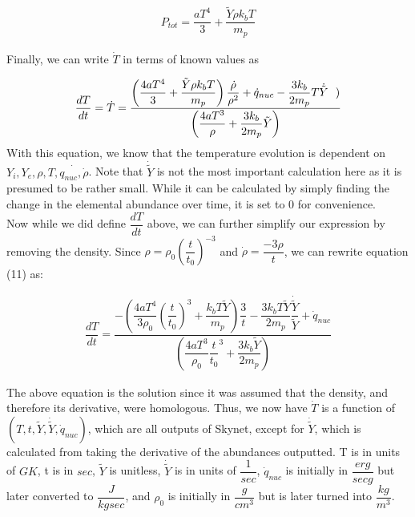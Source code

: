 \documentclass[11pt,a4paper]{article}
\begin{document}
\begin{align}
	P_{tot} = \dfrac{a T^4}{3} + \dfrac{\tilde{Y} \rho k_b T}{m_p}
\end{align} 

Finally, we can write $\dot{T}$ in terms of known values as 

\begin{align}
	\dfrac{dT}{dt} = \dot{T} = \dfrac{ \left(\dfrac{4 a T^4}{3} + \dfrac{\tilde{Y} \rho k_b T}{m_p} \right) \dfrac{\dot{\rho}}{\rho ^2} + \dot{q}_{nuc} - \dfrac{3 k_b}{2 m_p} T \dot{\tilde{Y}} \hspace{.09in})} { \left( \dfrac{4a T^3}{\rho}  + \dfrac{3 k_b}{2 m_p} \tilde{Y} \right)}
\end{align}
With this equation, we know that the temperature evolution is dependent on $Y_i, Y_e, \rho, T, \dot{q_{nuc}, \dot{\rho}}$. Note that $\dot{\tilde{Y}}$ is not the most important calculation here as it is presumed to be rather small. While it can be calculated by simply finding the change in the elemental abundance over time, it is set to 0 for convenience.\\
Now while we did define $\dfrac{dT}{dt}$ above, we can further simplify our expression by removing the density. Since $\rho = \rho_0 \left(\dfrac{t}{t_0}\right)^{-3}$ and $\dot{\rho} = \dfrac{-3 \rho}{t}$, we can rewrite equation (11) as:

\begin{align}
	\dfrac{dT}{dt} =  \dfrac{ -\left( \dfrac{4aT^4}{3 \rho_0} \left (\dfrac{t}{t_0} \right)^3 + \dfrac{k_b T \tilde{Y}}{m_p} \right) \dfrac{3}{t} - \dfrac{3 k_b T \tilde{Y}}{2 m_p} \dfrac{\dot{\tilde{Y}}}{\tilde{Y}} + \dot{q}_{nuc} } {  \left( \dfrac{4 a T^3}{\rho_0} \dfrac{t}{t_0}^3 + \dfrac{3 k_b \tilde{Y}}{2 m_p}\right) }
\end{align}

The above equation is the solution since it was assumed that the density, and therefore its derivative, were homologous. Thus, we now have $\dot{T}$ is a function of $(T,t,\tilde{Y}, \dot{\tilde{Y}},\dot{q}_{nuc})$, which are all outputs of Skynet, except for $\dot{\tilde{Y}}$, which is calculated from taking the derivative of the abundances outputted. T is in units of $GK$, t is in $sec$, $\tilde{Y}$ is unitless, $\dot{\tilde{Y}}$ is in units of $\dfrac{1}{sec}$, $\dot{q}_{nuc}$ is initially in $\dfrac{erg}{sec g}$ but later converted to $\dfrac{J}{kg sec}$, and $\rho_0$ is initially in $\dfrac{g}{{cm}^3}$ but is later turned into $\dfrac{kg}{m^3}$. \\
\end{document}
